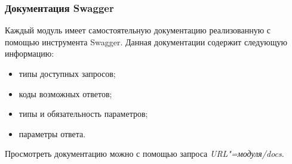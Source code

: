 \subsubsection{Документация Swagger}
Каждый модуль имеет самостоятельную документацию реализованную с помощью инструмента Swagger.
Данная документации содержит следующую информацию:
\begin{itemize}
    \item типы доступных запросов;
    \item коды возможных ответов;
    \item типы и обязательность параметров;
    \item параметры ответа.
\end{itemize}

Просмотреть документацию можно с помощью запроса \mbox{\emph{URL"=модуля/docs}}.